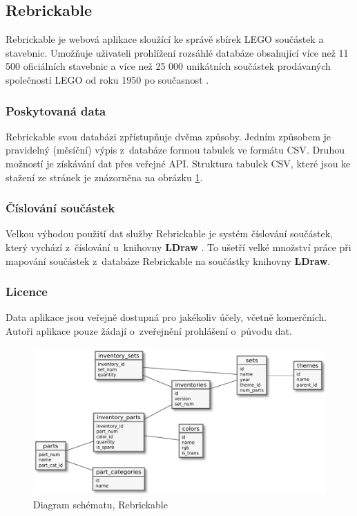 \subsection{Rebrickable}
  Rebrickable \autocite{rebrickable:homepage} je webová aplikace sloužící ke správě sbírek LEGO součástek a stavebnic. Umožňuje uživateli prohlížení rozsáhlé databáze obsahující více než 11 500 oficiálních stavebnic a více než 25 000 unikátních součástek prodávaných společností LEGO od roku 1950 po současnost \autocite{rebrickable:about}. 

  \subsubsection{Poskytovaná data}  
  Rebrickable svou databázi zpřístupňuje dvěma způsoby. Jedním způsobem je pravidelný (měsíční) výpis z~databáze formou tabulek ve formátu \gls{CSV}. Druhou možností je získávání dat přes veřejné \gls{API}. Struktura tabulek \gls{CSV}, které jsou ke stažení ze stránek \autocite{rebrickable:download} je znázorněna na obrázku \ref{diagram-rebrickable}.

  \subsubsection{Číslování součástek}
  Velkou výhodou použití dat služby Rebrickable je systém číslování součástek, který vychází z~číslování u~knihovny \textbf{LDraw} \autocite{rebrickable:faq}. To ušetří velké množství práce při mapování součástek z~databáze Rebrickable na součástky knihovny \textbf{LDraw}. 
  
  \subsubsection{Licence}
  Data aplikace jsou veřejně dostupná pro jakékoliv účely, včetně komerčních. Autoři aplikace pouze žádají o~zveřejnění prohlášení o~původu dat. \autocite{rebrickable:terms}
  
  \begin{figure}[htbp]
    \centering
    \includegraphics[width=\textwidth,height=\textheight,keepaspectratio]{pdfs/rebrickable_schema}
    \caption{Diagram schématu, Rebrickable \autocite{rebrickable:download}\label{diagram-rebrickable}}
  \end{figure}

